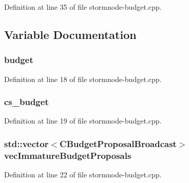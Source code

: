 Definition at line 35 of file stormnode-\/budget.\+cpp.



\subsection{Variable Documentation}
\hypertarget{stormnode-budget_8h_ad9842d355854ad5602728a96cf684706}{}
\subsubsection[{budget}]{ budget}\label{stormnode-budget_8h_ad9842d355854ad5602728a96cf684706}


Definition at line 18 of file stormnode-\/budget.\+cpp.

\hypertarget{stormnode-budget_8h_a2343791d00e01ac44a133ed313432d92}{}
\subsubsection[{cs\+\_\+budget}]{ cs\+\_\+budget}\label{stormnode-budget_8h_a2343791d00e01ac44a133ed313432d92}


Definition at line 19 of file stormnode-\/budget.\+cpp.

\hypertarget{stormnode-budget_8h_ad799c6b69cfbea7cdd37386b6b2a1429}{}
\subsubsection[{vec\+Immature\+Budget\+Proposals}]{\setlength{\rightskip}{0pt plus 5cm}std\+::vector$<${\bf C\+Budget\+Proposal\+Broadcast}$>$ vec\+Immature\+Budget\+Proposals}\label{stormnode-budget_8h_ad799c6b69cfbea7cdd37386b6b2a1429}


Definition at line 22 of file stormnode-\/budget.\+cpp.

\hypertarget{stormnode-budget_8h_adc3baf3c59479fff7d14e28c1496a178}{}
